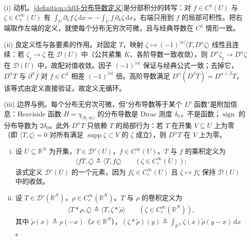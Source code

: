 \documentclass[../../main.tex]{subfiles}%
\begin{document}
\begin{remark}\label{remark:ch03-分布导数动机}
(i) 动机。\cref{definition:ch03-分布导数定义}是分部积分的转写：对 $f\in C^1(U)$ 与 $\zeta\in C^\infty_c(U)$ 有 $\int_U\partial_kf\,\zeta\,\mathrm{d}x=-\int_Uf\,\partial_k\zeta\,\mathrm{d}x$，右端只用到 $f$ 的局部可积性。把右端取作左端的定义，就使每个分布无穷次可微，且与经典导数在 $C^1$ 情形一致。

(ii) 良定义性与各要素的作用。对固定 $T$，映射 $\zeta\mapsto(-1)^{|\alpha|}\langle T,D^\alpha\zeta\rangle$ 线性且连续：若 $\zeta_j\to\zeta$ 在 $\mathcal{D}(U)$ 中（公共紧集 $K$、各阶导数一致收敛），则 $D^\alpha\zeta_j\to D^\alpha\zeta$ 在 $\mathcal{D}(U)$ 中，故配对值收敛。因子 $(-1)^{|\alpha|}$ 保证与经典公式一致；去掉它，$D^\alpha T$ 与 $\partial^\alpha f$ 对 $f\in C^1$ 相差 $(-1)^{|\alpha|}$ 倍。高阶导数满足 $D^\alpha(D^\beta T)=D^{\alpha+\beta}T$，该等式由定义直接验证，故定义无循环。

(iii) 边界与例。每个分布无穷次可微，但"分布导数等于某个 $L^p$ 函数"是附加信息：Heaviside 函数 $H=\chi_{[0,\infty)}$ 的分布导数是 Dirac 测度 $\delta_0$，不是函数；$\operatorname{sign}$ 的分布导数为 $2\delta_0$。此外 $D^\alpha T$ 只依赖 $T$ 的局部行为：若 $T$ 在开集 $V\subseteq U$ 上为零（即 $\langle T,\zeta\rangle=0$ 对所有满足 $\operatorname{supp}\zeta\subset V$ 的 $\zeta$ 成立），则 $D^\alpha T$ 在 $V$ 上为零。
\end{remark}

\begin{definition}\label{definition:ch03-乘积与卷积}
\label{definition:ch03-磨光}
\begin{enumerate}[(i)]
\item 设 $U\subseteq\mathbb{R}^N$ 为开集，$T\in\mathcal{D}'(U)$，$f\in C^\infty(U)$。$T$ 与 $f$ 的乘积定义为
\begin{align*}
\langle fT,\zeta\rangle\triangleq \langle T,f\zeta\rangle\qquad(\zeta\in C^\infty_c(U));
\end{align*}
该式定义 $\mathcal{D}'(U)$ 的一个元素，因为 $f\zeta\in C^\infty_c(U)$ 且 $\zeta\mapsto f\zeta$ 保持 $\mathcal{D}(U)$ 中的收敛。
\item 设 $T\in\mathcal{D}'(\mathbb{R}^N)$，$\rho\in C^\infty_c(\mathbb{R}^N)$。$T$ 与 $\rho$ 的卷积定义为
\begin{align*}
\langle T*\rho,\zeta\rangle\triangleq \langle T,\zeta*\widetilde\rho\rangle\qquad(\zeta\in C^\infty_c(\mathbb{R}^N)),
\end{align*}
其中 $\widetilde\rho(x)\triangleq \rho(-x)$（$x\in\mathbb{R}^N$），$(\zeta*\widetilde\rho)(y)\triangleq\int_{\mathbb{R}^N}\zeta(x)\widetilde\rho(y-x)\,\mathrm{d}x$。
\end{enumerate}
\end{definition}
\end{document}
